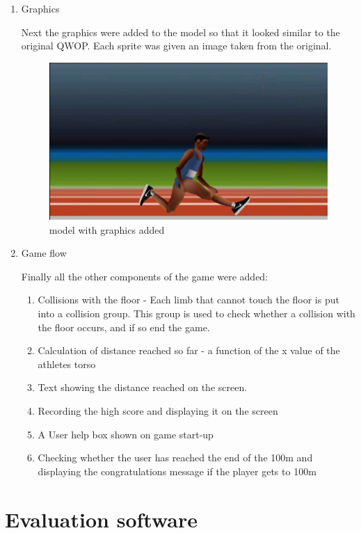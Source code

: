 \documentclass[12pt,a4paper,twoside,openright]{report}
\begin{document}
\begin{enumerate}
	\item Graphics

	Next the graphics were added to the model so that it looked similar to the original QWOP.
	Each sprite was given an image taken from the original.

	\begin{figure}[tbh]
	\centerline{\includegraphics[scale=0.4]{Images/modelWithGraphics.PNG}}
	\caption{model with graphics added}
	\label{modelWithGraphics}
	\end{figure}

	\item Game flow

	Finally all the other components of the game were added:

	\begin{enumerate}
		\item Collisions with the floor - Each limb that cannot touch the floor is put into a collision group. This group is used to check whether a collision with the floor occurs, and if so end the game.
		\item Calculation of distance reached so far - a function of the x value of the athletes torso
		\item Text showing the distance reached on the screen.
		\item Recording the high score and displaying it on the screen
		\item A User help box shown on game start-up
		\item Checking whether the user has reached the end of the 100m and displaying the congratulations message if the player gets to 100m
	\end{enumerate}
\end{enumerate}

\section{Evaluation software}
\end{document}
